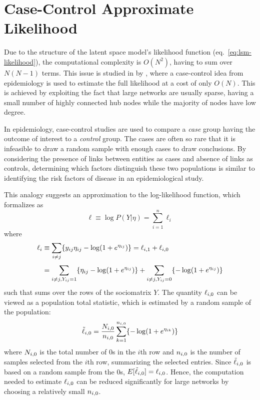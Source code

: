 \section{Case-Control Approximate Likelihood}\label{sec:case-control}

Due to the structure of the latent space model's likelihood function (eq.~\ref{eq:lsm-likelihood}), the computational complexity is $O(N^2)$, having to sum over $N(N-1)$ terms. This issue is studied in \cite{raftery2012fast} by \citeauthor{raftery2012fast}, where a case-control idea from epidemiology is used to estimate the full likelihood at a cost of only $O(N)$. This is achieved by exploiting the fact that large networks are usually sparse, having a small number of highly connected hub nodes while the majority of nodes have low degree.

In epidemiology, case-control studies are used to compare a \emph{case} group having the outcome of interest to a \emph{control} group. The cases are often so rare that it is infeasible to draw a random sample with enough cases to draw conclusions.
By considering the presence of links between entities as cases and absence of links as controls, determining which factors distinguish these two populations is similar to identifying the risk factors of disease in an epidemiological study.

This analogy suggests an approximation to the log-likelihood function, which \citeauthor*{raftery2012fast} formalizes as
\begin{equation}
\label{eq:case-likelihood-approx}
    \ell \equiv \log P(Y|\eta)=\sum_{i=1}^n \ell_i
\end{equation}
where
\begin{equation}
    \setlength{\jot}{0.5\baselineskip}
    \begin{split}
        \ell_i &\equiv \sum_{i\neq j}\{\sub(y)\sub(\eta)-\log(1+e^{\sub(\eta)})\} = \sub(\ell)(i,1) + \sub(\ell)(i,0)\\
        &= \sum_{i\neq j, \sub(Y)=1} \{\sub(\eta)-\log(1+e^{\sub(\eta)}) \} + \sum_{i\neq j, \sub(Y)=0} \{-\log(1+e^{\sub(\eta)}) \} \\
    \end{split}
\end{equation}
such that  sums over the rows of the sociomatrix $Y$. The quantity $\sub(\ell)(i,0)$ can be viewed as a population total statistic, which is estimated by a random sample of the population:
\begin{equation}
    \sub(\tilde{\ell})(i,0)=\frac{\sub(N)(i,0)}{\sub(n)(i,0)} \sum_{k=1}^{\sub(n)(i,0)} \{ -\log(1+e^{\sub(\eta)(ik)}) \}
\end{equation}
where $\sub(N)(i,0)$ is the total number of 0s in the $i$th row and $\sub(n)(i,0)$ is the number of samples selected from the $i$th row, summarizing the selected entries. Since $\sub(\tilde{\ell})(i,0)$ is based on a random sample from the 0s, $E[\sub(\tilde{\ell})(i,0)] = \sub(\ell)(i,0)$. Hence, the computation needed to estimate $\sub(\ell)(i,0)$ can be reduced significantly for large networks by choosing a relatively small $\sub(n)(i,0)$.

